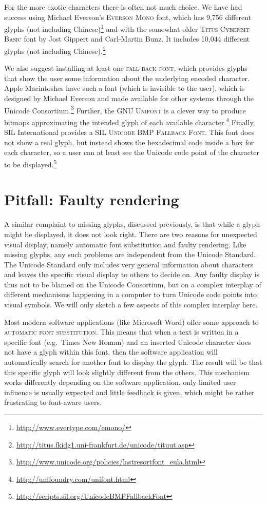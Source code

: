 For the more exotic characters there is often not much choice. We have had success using 
Michael Everson's \textsc{Everson Mono} font, which has 9,756 different glyphs (not including 
Chinese)\footnote{\url{http://www.evertype.com/emono/}} and with the somewhat older \textsc{Titus Cyberbit Basic} font 
by Jost Gippert and Carl-Martin Bunz. It includes 10,044 different glyphs (not including 
Chinese).\footnote{\url{http://titus.fkidg1.uni-frankfurt.de/unicode/tituut.asp}} 

We also suggest installing at least one \textsc{fall-back
font}, which provides glyphs that show the user some information about
the underlying encoded character. Apple Macintoshes have such a font (which is
invisible to the user), which is designed by Michael Everson and made available
for other systems through the Unicode Consortium.\footnote{
\url{http://www.unicode.org/policies/lastresortfont\_eula.html}} Further, the
\textsc{GNU Unifont} is a clever way to produce bitmaps approximating the
intended glyph of each available character.\footnote{\url{http://unifoundry.com/unifont.html}} Finally,
SIL International provides a \textsc{SIL Unicode BMP Fallback
Font}. This font does not show a real 
glyph, but instead shows the hexadecimal code inside a box
for each character, so a user can at least see the Unicode code point of the
character to be displayed.\footnote{\url{http://scripts.sil.org/UnicodeBMPFallbackFont}}

\section{Pitfall: Faulty rendering}
\label{pitfall-faulty-rendering}

A similar complaint to missing glyphs, discussed previously, is that while 
a glyph might be displayed, it does not look right. There are two
reasons for unexpected visual display, namely automatic font substitution and
faulty rendering. Like missing glyphs, any such problems are independent from
the Unicode Standard. The Unicode Standard only includes very general
information about characters and leaves the specific visual display to others to
decide on. Any faulty display is thus not to be blamed on the Unicode
Consortium, but on a complex interplay of different mechanisms happening in a
computer to turn Unicode code points into visual symbols. We will only sketch a
few aspects of this complex interplay here.

Most modern software applications (like Microsoft Word) offer some approach to
\textsc{automatic font substitution}. This means that when a text is written in
a specific font (e.g.~Times New Roman) and an inserted Unicode character does not
have a glyph within this font, then the software application will automatically
search for another font to display the glyph. The result will be that this
specific glyph will look slightly different from the others. This mechanism
works differently depending on the software application, only limited
user influence is usually expected and little feedback is given, which might be rather
frustrating to font-aware users.

